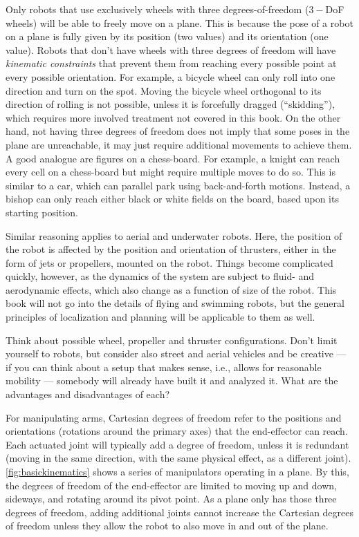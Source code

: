 Only robots that use exclusively wheels with three degrees-of-freedom ($3-$DoF wheels) will be able to freely move on a plane. This is because the pose of a robot on a plane is fully given by its position (two values) and its orientation (one value). Robots that don't have wheels with three degrees of freedom will have \textsl{kinematic constraints} that prevent them from reaching every possible point at every possible orientation. For example, a bicycle wheel can only roll into one direction and turn on the spot. Moving the bicycle wheel orthogonal to its direction of rolling is not possible, unless it is forcefully dragged (``skidding''), which requires more involved treatment not covered in this book. On the other hand, not having three degrees of freedom does not imply that some poses in the plane are unreachable, it may just require additional movements to achieve them.
A good analogue are figures on a chess-board. For example, a knight can reach every cell on a chess-board but might require multiple moves to do so. This is similar to a car, which can parallel park using back-and-forth motions. Instead, a bishop can only reach either black or white fields on the board, based upon its starting position.

Similar reasoning applies to aerial and underwater robots. Here, the position of the robot is affected by the position and orientation of thrusters, either in the form of jets or propellers, mounted on the robot. Things become complicated quickly, however, as the dynamics of the system are subject to fluid- and aerodynamic effects, which also change as a function of size of the robot. This book will not go into the details of flying and swimming robots, but the general principles of localization and planning will be applicable to them as well.

\begin{mdframed}Think about possible wheel, propeller and thruster configurations. Don't limit yourself to robots, but consider also street and aerial vehicles and be creative --- if you can think about a setup that makes sense, i.e., allows for reasonable mobility --- somebody will already have built it and analyzed it. What are the advantages and disadvantages of each?
\end{mdframed}

For manipulating arms, Cartesian degrees of freedom refer to the positions and orientations (rotations around the primary axes) that the end-effector can reach. Each actuated joint will typically add a degree of freedom, unless it is redundant (moving in the same direction, with the same physical effect, as a different joint). \cref{fig:basickinematics} shows a series of manipulators operating in a plane. By this, the degrees of freedom of the end-effector are limited to moving up and down, sideways, and rotating around its pivot point. As a plane only has those three degrees of freedom, adding additional joints cannot increase the Cartesian degrees of freedom unless they allow the robot to also move in and out of the plane.

